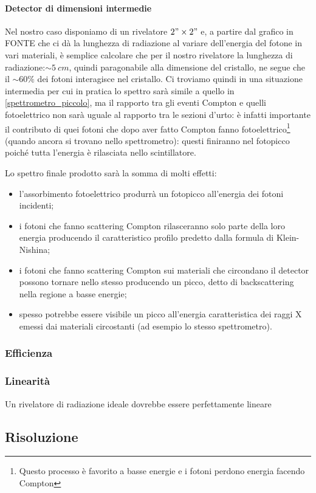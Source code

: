  \paragraph{Detector di dimensioni intermedie}Nel nostro caso disponiamo di un rivelatore $2"\times2"$ e, a partire dal grafico in FONTE che ci dà la lunghezza di radiazione al variare dell'energia del fotone in vari materiali, è semplice calcolare che per il nostro rivelatore la lunghezza di radiazione:$\sim \SI{5}{cm}$, quindi paragonabile alla dimensione del cristallo, ne segue che il $\sim 60\%$ dei fotoni interagisce nel cristallo. Ci troviamo quindi in una situazione intermedia per cui in pratica lo spettro sarà simile a quello in \autoref{spettrometro_piccolo}, ma il rapporto tra gli eventi Compton e quelli fotoelettrico non sarà uguale al rapporto tra le sezioni d'urto: è infatti importante il contributo di quei fotoni che dopo aver fatto Compton fanno fotoelettrico\footnote{Questo processo è favorito a basse energie e i fotoni perdono energia facendo Compton} (quando ancora si trovano nello spettrometro): questi finiranno nel fotopicco poiché tutta l'energia è rilasciata nello scintillatore. 
 
 Lo spettro finale prodotto sarà la somma di molti effetti:
 \begin{itemize}
 	\item l'assorbimento fotoelettrico produrrà un fotopicco all'energia dei fotoni incidenti;
 	\item i fotoni che fanno scattering Compton rilasceranno solo parte della loro energia producendo il caratteristico profilo predetto dalla  formula di Klein-Nishina;
 	\item i fotoni che fanno scattering Compton sui materiali che circondano il detector possono tornare nello stesso producendo un picco, detto di backscattering nella regione a basse energie;
 	\item spesso potrebbe essere visibile un picco all'energia caratteristica dei raggi X emessi dai materiali circostanti (ad esempio lo stesso spettrometro).
 \end{itemize}
  
 
 \subsubsection{Efficienza}
 
 \subsubsection{Linearità}
 Un rivelatore di radiazione ideale dovrebbe essere perfettamente lineare 
 \subsection{Risoluzione}
 
 
 
 
 